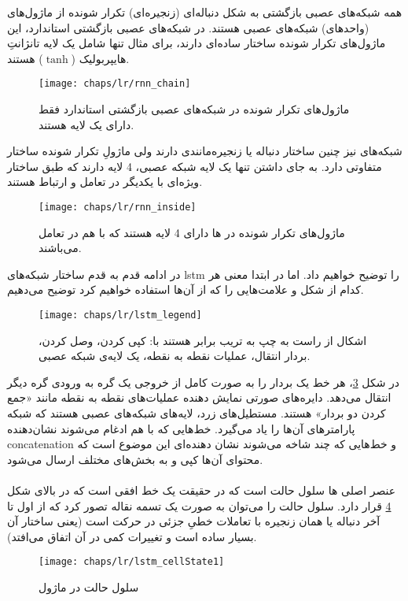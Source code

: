  همه شبکه‌های عصبی بازگشتی به شکل دنباله‌ای (زنجیره‌ای) تکرار شونده از ماژول‌های (واحد‌های) شبکه‌های عصبی هستند. در شبکه‌های عصبی بازگشتی استاندارد، این ماژول‌های تکرار شونده ساختار ساده‌ای دارند، برای مثال تنها شامل یک لایه تانژانتِ هایپربولیک ($\tanh$) هستند.
 
 \begin{figure}[!ht]
 	\centerline{\texttt{[image: chaps/lr/rnn\_chain]}}
 	\caption{
ماژول‌های تکرار شونده در شبکه‌های عصبی بازگشتی استاندارد فقط دارای یک لایه هستند.
 	}
 	\label{fig:ch_lr:rnn_chain}
 \end{figure}
 
 شبکه‌های  نیز چنین ساختار دنباله یا زنجیره‌مانندی دارند ولی ماژولِ تکرار شونده ساختار متفاوتی دارد. به جای داشتن تنها یک لایه شبکه عصبی، 4 لایه دارند که طبق ساختار ویژه‌ای با یکدیگر در تعامل و ارتباط هستند.
 \begin{figure}[!ht]
	\centerline{\texttt{[image: chaps/lr/rnn\_inside]}}
	\caption{
		ماژول‌های تکرار شونده در ها دارای 4 لایه هستند که با هم در تعامل می‌باشند.
	}
	\label{fig:ch_lr:rnn_inside}
\end{figure} 
در ادامه قدم به قدم ساختار شبکه‌های \gls{lstm} را توضیح خواهیم داد. اما در ابتدا معنی هر کدام از شکل‌ و علامت‌هایی را که از آن‌ها استفاده خواهیم کرد توضیح می‌دهیم.
  \begin{figure}[!ht]
 	\centerline{\texttt{[image: chaps/lr/lstm\_legend]}}
 	\caption{
 		اشکال از راست به چپ به تریب برابر هستند با: کپی کردن، وصل کردن، بردار انتقال، عملیات نقطه به نقطه، یک لایه‌ی شبکه عصبی.
 	}
 	\label{fig:ch_lr:lstm_legend}
 \end{figure} 
 در شکل \ref{fig:ch_lr:lstm_legend}، هر خط یک بردار را به صورت کامل از خروجی یک گره به ورودی گره دیگر انتقال می‌دهد. دایره‌های صورتی نمایش دهنده عملیات‌های نقطه‌ به نقطه مانند «جمع کردن دو بردار» هستند. مستطیل‌های زرد، لایه‌‌های شبکه‌های عصبی هستند که شبکه پارامتر‌های آن‌ها را یاد می‌گیرد. خط‌هایی که با هم ادغام می‌شوند نشان‌دهنده \gls{concatenation} و خط‌هایی که چند شاخه می‌شوند نشان دهنده‌ای این موضوع است که محتوای آن‌ها کپی و به بخش‌های مختلف ارسال می‌شود.
\\
\\
 عنصر اصلی ها سلول حالت است که در حقیقت یک خط افقی است که در بالای شکل \ref{fig:ch_lr:lstm_cellState1} قرار دارد.
 سلول حالت را می‌توان به صورت یک تسمه نقاله تصور کرد که از اول تا آخر دنباله یا همان زنجیره با تعاملات خطیِ جزئی در حرکت است (یعنی ساختار آن بسیار ساده است و تغییرات کمی در آن اتفاق می‌افتد).
   \begin{figure}[!ht]
 	\centerline{\texttt{[image: chaps/lr/lstm\_cellState1]}}
 	\caption{
 		سلول حالت در ماژول 
 	}
 	\label{fig:ch_lr:lstm_cellState1}
 \end{figure} 
